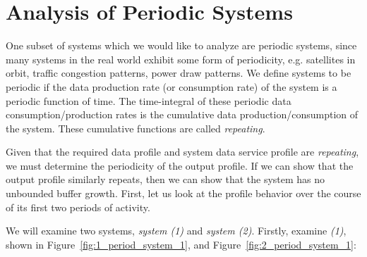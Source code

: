 \newpage

\section{Analysis of Periodic Systems}
\label{sec:periodic}

One subset of systems which we would like to analyze are periodic
systems, since many systems in the real world exhibit some form of
periodicity, e.g. satellites in orbit, traffic congestion patterns,
power draw patterns.  We define systems to be periodic if the data
production rate (or consumption rate) of the system is a periodic
function of time.  The time-integral of these periodic data
consumption/production rates is the cumulative data
production/consumption of the system.  These cumulative functions are
called \emph{repeating}.

Given that the required data profile and system data service profile
are \emph{repeating}, we must determine the periodicity of the output
profile.  If we can show that the output profile similarly repeats,
then we can show that the system has no unbounded buffer growth.
First, let us look at the profile behavior over the course of its
first two periods of activity.

We will examine two systems, \emph{system (1)} and \emph{system (2)}.
Firstly, examine \emph{(1)}, shown in
Figure~\ref{fig:1_period_system_1}, and
Figure~\ref{fig:2_period_system_1}:

